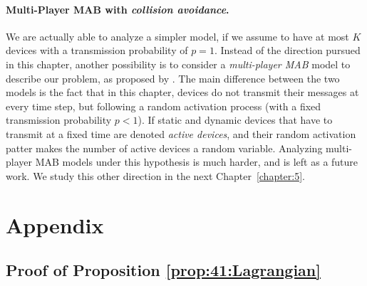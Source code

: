 \paragraph{Multi-Player MAB with \emph{collision avoidance}.}

We are actually able to analyze a simpler model, if we assume to have at most $K$ devices with a transmission probability of $p=1$.
Instead of the direction pursued in this chapter, another possibility is to consider a \emph{multi-player MAB} model to describe our problem, as proposed by \cite{Zhao10}.
%
The main difference between the two models is the fact that in this chapter, devices do not transmit their messages at every time step, but following a random activation process (with a fixed transmission probability $p < 1$).
If static and dynamic devices that have to transmit at a fixed time are denoted \emph{active devices},
and their random activation patter makes the number of active devices a random variable.
Analyzing multi-player MAB models under this hypothesis is much harder, and is left as a future work.
%
We study this other direction in the next Chapter~\ref{chapter:5}.


\newpage
\section{Appendix}
\label{sec:4:appendix}

\subsection{Proof of Proposition \ref{prop:41:Lagrangian}}
\label{sec:4:proofLagrangian}

